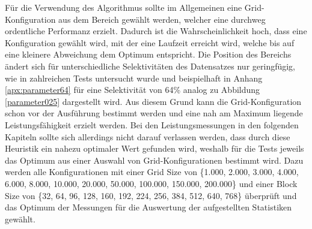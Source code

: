 Für die Verwendung des Algorithmus sollte im Allgemeinen eine Grid-Konfiguration aus dem Bereich gewählt werden, welcher eine durchweg ordentliche Performanz erzielt.
Dadurch ist die Wahrscheinlichkeit hoch, dass eine Konfiguration gewählt wird, mit der eine Laufzeit erreicht wird, welche bis auf eine kleinere Abweichung dem Optimum entspricht.
Die Position des Bereichs ändert sich für unterschiedliche Selektivitäten des Datensatzes nur geringfügig, wie in zahlreichen Tests untersucht wurde und beispielhaft in Anhang \ref{apx:parameter64} für eine Selektivität von 64\% analog zu Abbildung \ref{parameter025} dargestellt wird.
Aus diesem Grund kann die Grid-Konfiguration schon vor der Ausführung bestimmt werden und eine nah am Maximum liegende Leistungsfähigkeit erzielt werden.
Bei den Leistungsmessungen in den folgenden Kapiteln sollte sich allerdings nicht darauf verlassen werden, dass durch diese Heuristik ein nahezu optimaler Wert gefunden wird, weshalb für die Tests jeweils das Optimum aus einer Auswahl von Grid-Konfigurationen bestimmt wird.
Dazu werden alle Konfigurationen mit einer Grid Size von \{1.000, 2.000, 3.000, 4.000, 6.000, 8.000, 10.000, 20.000, 50.000, 100.000, 150.000, 200.000\} und einer Block Size von \{32, 64, 96, 128, 160, 192, 224, 256, 384, 512, 640, 768\} überprüft und das Optimum der Messungen für die Auswertung der aufgestellten Statistiken gewählt.